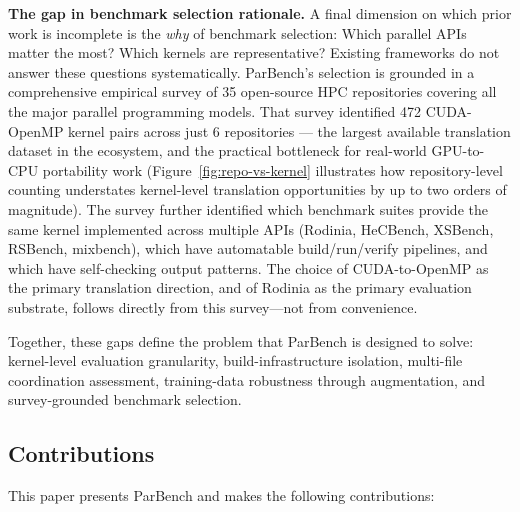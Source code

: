 \documentclass[conference]{IEEEtran}
\begin{document}
\textbf{The gap in benchmark selection rationale.} A final dimension on which prior work is incomplete is the \emph{why} of benchmark selection: Which parallel APIs matter the most? Which kernels are representative? Existing frameworks do not answer these questions systematically. ParBench's selection is grounded in a comprehensive empirical survey of 35 open-source HPC repositories covering all the major parallel programming models. That survey identified 472 CUDA-OpenMP kernel pairs across just 6 repositories --- the largest available translation dataset in the ecosystem, and the practical bottleneck for real-world GPU-to-CPU portability work (Figure~\ref{fig:repo-vs-kernel} illustrates how repository-level counting understates kernel-level translation opportunities by up to two orders of magnitude). The survey further identified which benchmark suites provide the same kernel implemented across multiple APIs (Rodinia, HeCBench, XSBench, RSBench, mixbench), which have automatable build/run/verify pipelines, and which have self-checking output patterns. The choice of CUDA-to-OpenMP as the primary translation direction, and of Rodinia as the primary evaluation substrate, follows directly from this survey---not from convenience.

Together, these gaps define the problem that ParBench is designed to solve: kernel-level evaluation granularity, build-infrastructure isolation, multi-file coordination assessment, training-data robustness through augmentation, and survey-grounded benchmark selection.

\subsection{Contributions}
\label{sec:contributions}

This paper presents ParBench and makes the following contributions:
\end{document}
